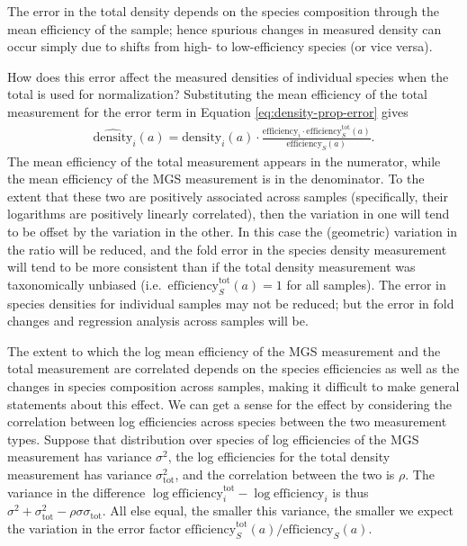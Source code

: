 \documentclass[
]{article}
\begin{document}
The error in the total density depends on the species composition through the mean efficiency of the sample; hence spurious changes in measured density can occur simply due to shifts from high- to low-efficiency species (or vice versa).

How does this error affect the measured densities of individual species when the total is used for normalization?
Substituting the mean efficiency of the total measurement for the error term in Equation \eqref{eq:density-prop-error} gives
\begin{align}
  \label{eq:app-density-prop-error}
  \widehat{\text{density}}_{i}(a) 
  = \text{density}_{i}(a) \cdot \frac{\text{efficiency}_{i} \cdot \text{efficiency}^{\text{tot}}_S(a)}{\text{efficiency}_S(a)}.
\end{align}
The mean efficiency of the total measurement appears in the numerator, while the mean efficiency of the MGS measurement is in the denominator.
To the extent that these two are positively associated across samples (specifically, their logarithms are positively linearly correlated), then the variation in one will tend to be offset by the variation in the other.
In this case the (geometric) variation in the ratio will be reduced, and the fold error in the species density measurement will tend to be more consistent than if the total density measurement was taxonomically unbiased (i.e.~\(\text{efficiency}^\text{tot}_S(a) = 1\) for all samples).
The error in species densities for individual samples may not be reduced; but the error in fold changes and regression analysis across samples will be.

The extent to which the log mean efficiency of the MGS measurement and the total measurement are correlated depends on the species efficiencies as well as the changes in species composition across samples, making it difficult to make general statements about this effect.
We can get a sense for the effect by considering the correlation between log efficiencies across species between the two measurement types.
Suppose that distribution over species of log efficiencies of the MGS measurement has variance \(\sigma^{2}\), the log efficiencies for the total density measurement has variance \(\sigma_{\text{tot}}^{2}\), and the correlation between the two is \(\rho\).
The variance in the difference \(\log \text{efficiency}_{i}^{\text{tot}} - \log \text{efficiency}_{i}\) is thus \(\sigma^{2} + \sigma_{\text{tot}}^{2} - \rho \sigma \sigma_{\text{tot}}\).
All else equal, the smaller this variance, the smaller we expect the variation in the error factor \(\text{efficiency}^{\text{tot}}_S(a)/ \text{efficiency}_S(a)\).
\end{document}
